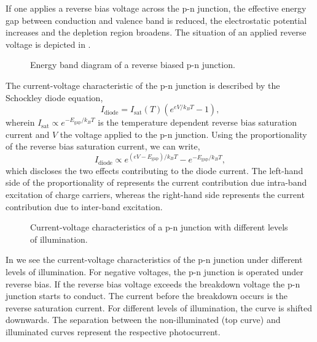 If one applies a reverse bias voltage across the p-n junction, the effective energy gap between conduction and valence band is reduced, the electrostatic potential increases and the depletion region broadens.
The situation of an applied reverse voltage is depicted in .
\begin{figure}[H]
	\centering
	
	\caption{Energy band diagram of a reverse biased p-n junction.}\label{fig:pn_junction_reverse}
\end{figure}
The current-voltage characteristic of the p-n junction is described by the Schockley diode equation,
\begin{equation}
	I_\text{diode}=I_\text{sat}(T)\left(e^{eV/k_BT}-1\right)
	\label{eq:diode_current},
\end{equation}
wherein $I_\text{sat}\propto e^{-E_\text{gap}/k_BT}$ is the temperature dependent reverse bias saturation current and $V$ the voltage applied to the p-n junction.
Using the proportionality of the reverse bias saturation current, we can write,
\begin{equation}
	I_\text{diode}\propto e^{\left(eV-E_\text{gap}\right)/k_BT}-e^{-E_\text{gap}/k_BT}\label{eq:diode_current_prop},
\end{equation} 
which discloses the two effects contributing to the diode current.
The left-hand side of the proportionality of  represents the current contribution due intra-band excitation of charge carriers, whereas the right-hand side represents the current contribution due to inter-band excitation.
\begin{figure}[H]
	\centering
	
	\caption{Current-voltage characteristics of a p-n junction with different levels of illumination.}\label{fig:pn_junction_iv}
\end{figure}
In  we see the current-voltage characteristics of the p-n junction under different levels of illumination.
For negative voltages, the p-n junction is operated under reverse bias.
If the reverse bias voltage exceeds the breakdown voltage the p-n junction starts to conduct.
The current before the breakdown occurs is the reverse saturation current.
For different levels of illumination, the curve is shifted downwards.
The separation between the non-illuminated (top curve) and illuminated curves represent the respective photocurrent.

